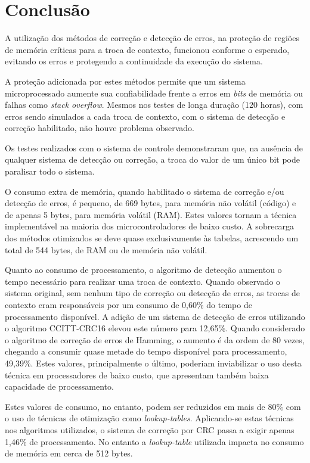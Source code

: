 \documentclass[12pt,openright,oneside,a4paper,brazil]{abntex2}
\begin{document}
\chapter{Conclusão}

A utilização dos métodos de correção e detecção de erros, na proteção de regiões de memória críticas para a troca de contexto, funcionou conforme o esperado, evitando os erros e protegendo a continuidade da execução do sistema.

A proteção adicionada por estes métodos permite que um sistema microprocessado aumente sua confiabilidade frente a erros em \textit{bits} de memória ou falhas como \textit{stack overflow}. Mesmos nos testes de longa duração (120 horas), com erros sendo simulados a cada troca de contexto, com o sistema de detecção e correção habilitado, não houve problema observado.

Os testes realizados com o sistema de controle demonstraram que, na ausência de qualquer sistema de detecção ou correção, a troca do valor de um único bit pode paralisar todo o sistema. 

O consumo extra de memória, quando habilitado o sistema de correção e/ou detecção de erros, é pequeno, de 669 bytes, para memória não volátil (código) e de apenas 5 bytes, para memória volátil (RAM). Estes valores tornam a técnica implementável na maioria dos microcontroladores de baixo custo. A sobrecarga dos métodos otimizados se deve quase exclusivamente às tabelas, acrescendo um total de 544 bytes, de RAM ou de memória não volátil.

Quanto ao consumo de processamento, o algoritmo de detecção aumentou o tempo necessário para realizar uma troca de contexto. Quando observado o sistema original, sem nenhum tipo de correção ou detecção de erros, as trocas de contexto eram responsáveis por um consumo de 0,60\% do tempo de processamento disponível. A adição de um sistema de detecção de erros utilizando o algoritmo CCITT-CRC16 elevou este número para 12,65\%. Quando considerado o algoritmo de correção de erros de Hamming, o aumento é da ordem de 80 vezes, chegando a consumir quase metade do tempo disponível para processamento, 49,39\%. Estes valores, principalmente o último, poderiam inviabilizar o uso desta técnica em processadores de baixo custo, que apresentam também baixa capacidade de processamento.

Estes valores de consumo, no entanto, podem ser reduzidos em mais de 80\% com o uso de técnicas de otimização como \textit{lookup-tables}. Aplicando-se estas técnicas nos algoritmos utilizados, o sistema de correção por CRC passa a exigir apenas 1,46\% de processamento. No entanto a \textit{lookup-table} utilizada impacta no consumo de memória em cerca de 512 bytes.
\end{document}
